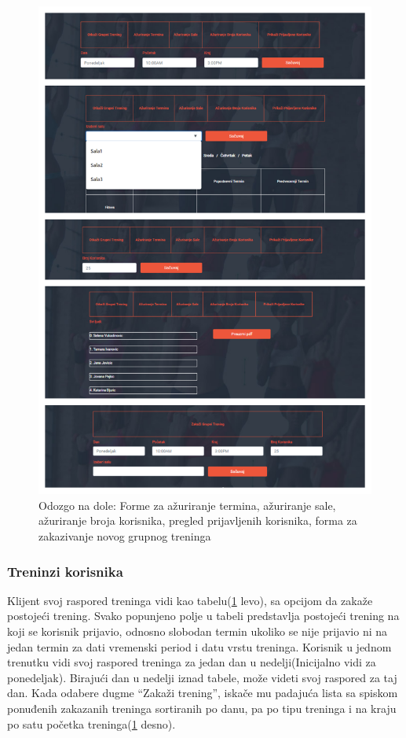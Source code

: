 \documentclass[../main.tex]{subfiles}
\begin{document}
\begin{figure}[!ht]
\begin{center}
\includegraphics[scale=0.35]{sections/korisnicki_interfejs/screenshots/trener_raspored.png}
\end{center}
\caption{ Odozgo na dole: Forme za ažuriranje termina, ažuriranje sale, ažuriranje broja korisnika, pregled prijavljenih korisnika, forma za zakazivanje novog grupnog treninga }
\label{fig:trener_forme}
\end{figure}

\subsubsection{Treninzi korisnika}
Klijent svoj raspored treninga vidi kao tabelu(\ref{fig:trener_forme} levo), sa opcijom da zakaže postojeći trening. Svako popunjeno polje u tabeli predstavlja postojeći trening na koji se korisnik prijavio, odnosno slobodan termin ukoliko se nije prijavio ni na jedan termin za dati vremenski period i datu vrstu treninga. Korisnik u jednom trenutku vidi svoj raspored treninga za jedan dan u nedelji(Inicijalno vidi za ponedeljak). Birajući dan u nedelji iznad tabele, može videti svoj raspored za taj dan.
Kada odabere dugme ``Zakaži trening'', iskače mu padajuća lista sa spiskom ponuđenih zakazanih treninga sortiranih po danu, pa po tipu treninga i na kraju po satu početka treninga(\ref{fig:trener_forme} desno).
\end{document}
